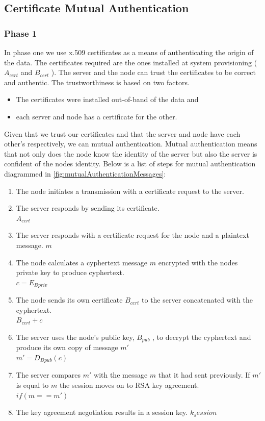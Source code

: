 \subsection{Certificate Mutual Authentication}
\subsubsection{Phase 1}
In phase one we use x.509 certificates as a means of authenticating the origin of the data.
The certificates required are the ones installed at system provisioning ( $A{_{cert}}$ and $B{_{cert}}$ ). 
The server and the node can trust the certificates to be correct and authentic. The trustworthiness is based on two factors. 
\begin{itemize}
\item The certificates were installed out-of-band of the data and 
\item each server and node has a certificate for the other. 
\end{itemize}
Given that we trust our certificates and that the server and node have each other’s respectively, we can mutual authentication. 
Mutual authentication means that not only does the node know the identity of the server but also the server is confident of the nodes identity. 
Below is a list of steps for mutual authentication diagrammed in \autoref{fig:mutualAuthenticationMessages}:

\begin{enumerate}
\item The node initiates a transmission with a certificate request to the server. 
\item The server responds by sending its certificate. \\ $A{_{cert}}$ \par
\item The server responds with a certificate request for the node and a plaintext message. $m$
\item The node calculates a cyphertext message $m$ encrypted with the nodes private key to produce cyphertext. \\
$c=E{_B{_{priv}}}$
\item The node sends its own certificate $B{_{cert}}$  to the server concatenated with the cyphertext.  \\$B{_{cert}} + c$
\item The server uses the node’s public key, $B{_{pub}}$ , to decrypt the cyphertext and produce its own copy of message $m'$\\$m'=D{_B{_{pub}}}(c)$
\item The server compares $m′$ with the message $m$ that it had sent previously. If $m'$ is equal to $m$ the session moves on to RSA key agreement. \\ $if (m == m')$
\item The key agreement negotiation results in a session key. $k{_session}$ 
\end{enumerate}
 
